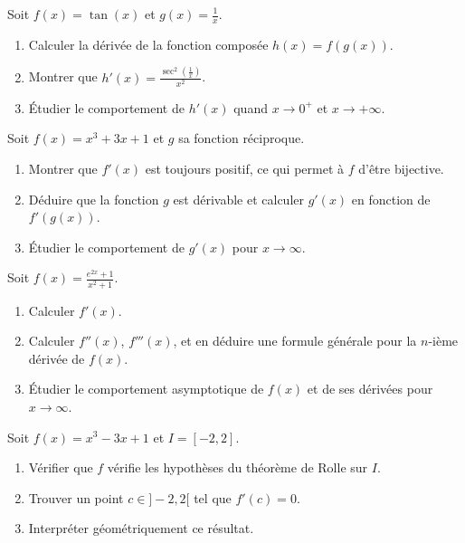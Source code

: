\begin{exercice}
Soit \( f(x) = \tan(x) \) et \( g(x) = \frac{1}{x} \).
\begin{enumerate}
    \item Calculer la dérivée de la fonction composée \( h(x) = f(g(x)) \).
    \item Montrer que \( h'(x) = \frac{\sec^2\left(\frac{1}{x}\right)}{x^2} \).
    \item Étudier le comportement de \( h'(x) \) quand \( x \to 0^+ \) et \( x \to +\infty \).
\end{enumerate}
\end{exercice}

\begin{exercice}
Soit \( f(x) = x^3 + 3x + 1 \) et \( g \) sa fonction réciproque.
\begin{enumerate}
    \item Montrer que \( f'(x) \) est toujours positif, ce qui permet à \( f \) d’être bijective.
    \item Déduire que la fonction \( g \) est dérivable et calculer \( g'(x) \) en fonction de \( f'(g(x)) \).
    \item Étudier le comportement de \( g'(x) \) pour \( x \to \infty \).
\end{enumerate}
\end{exercice}

\begin{exercice}
Soit \( f(x) = \frac{e^{2x} + 1}{x^2 + 1} \).
\begin{enumerate}
    \item Calculer \( f'(x) \).
    \item Calculer \( f''(x) \), \( f'''(x) \), et en déduire une formule générale pour la \( n \)-ième dérivée de \( f(x) \).
    \item Étudier le comportement asymptotique de \( f(x) \) et de ses dérivées pour \( x \to \infty \).
\end{enumerate}
\end{exercice}

\begin{exercice}
Soit \( f(x) = x^3 - 3x + 1 \) et \( I = [-2, 2] \).
\begin{enumerate}
    \item Vérifier que \( f \) vérifie les hypothèses du théorème de Rolle sur \( I \).
    \item Trouver un point \( c \in ]-2, 2[ \) tel que \( f'(c) = 0 \).
    \item Interpréter géométriquement ce résultat.
\end{enumerate}
\end{exercice}

